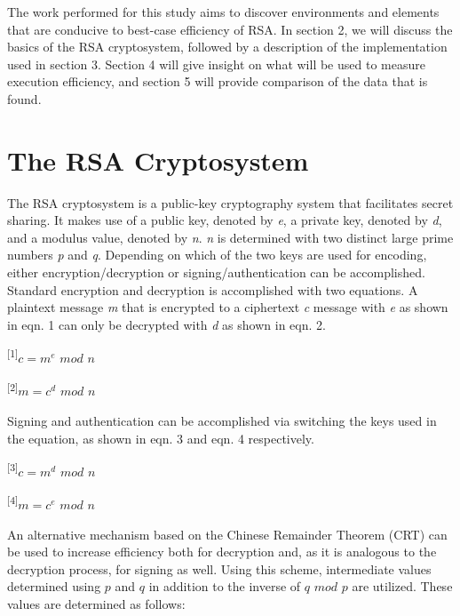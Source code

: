\documentclass[journal]{IEEEtran}
\begin{document}
The work performed for this study aims to discover environments and elements that are conducive to best-case efficiency of RSA. In section 2, we will discuss the basics of the RSA cryptosystem, followed by a description of the implementation used in section 3. Section 4 will give insight on what will be used to measure execution efficiency, and section 5 will provide comparison of the data that is found. 




\section{The RSA Cryptosystem}
The RSA cryptosystem is a public-key cryptography system that facilitates secret sharing. It makes use of a public key, denoted by \textit{e}, a private key, denoted by \textit{d}, and a modulus value, denoted by \textit{n}. \textit{n} is determined with two distinct large prime numbers \textit{p} and \textit{q}. Depending on which of the two keys are used for encoding, either encryption/decryption or signing/authentication can be accomplished. Standard encryption and decryption is accomplished with two equations. A plaintext message \textit{m} that is encrypted to a ciphertext \textit{c} message with \textit{e} as shown in eqn. 1 can only be decrypted with \textit{d} as shown in eqn. 2.\newline

\textsuperscript{[1]}$c = m^e$ $mod$ $n$

\textsuperscript{[2]}$m = c^d$ $mod$ $n$
\newline

Signing and authentication can be accomplished via switching the keys used in the equation, as shown in eqn. 3 and eqn. 4 respectively.\newline

\textsuperscript{[3]}$c = m^d$ $mod$ $n$

\textsuperscript{[4]}$m = c^e$ $mod$ $n$
\newline

An alternative mechanism based on the Chinese Remainder Theorem (CRT) can be used to increase efficiency both for decryption and, as it is analogous to the decryption process, for signing as well. Using this scheme, intermediate values determined using $p$ and $q$ in addition to the inverse of $q$ $mod$ $p$ are utilized. These values are determined as follows:\newline
\end{document}
